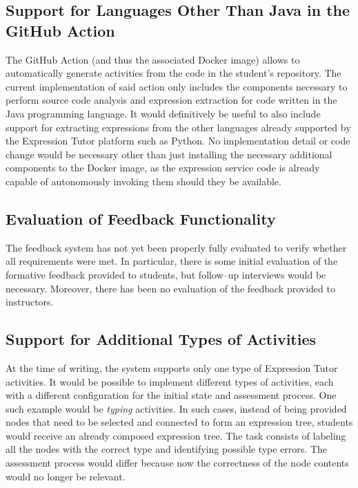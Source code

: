 \begin{chapterBody}
\subsection*{Support for Languages Other Than Java in the GitHub Action}

The GitHub Action (and thus the associated Docker image) allows to 
automatically generate activities from the code in the student's repository.
The current implementation of said action only includes the components necessary
to perform source code analysis and expression extraction for code written in
the Java programming language. It would definitively be useful to also include
support for extracting expressions from the other languages already supported by
the Expression Tutor platform such as Python. No implementation detail or code
change would be necessary other than just installing the necessary additional 
components to the Docker image, as the expression service code is already
capable of autonomously invoking them should they be available.

\subsection*{Evaluation of Feedback Functionality}

The feedback system has not yet been properly fully evaluated to verify whether
all requirements were met. In particular, there is some initial evaluation of
the formative feedback provided to students, but follow–up interviews would be
necessary. Moreover, there has been no evaluation of the feedback
provided to instructors.

\subsection*{Support for Additional Types of Activities}

At the time of writing, the system supports only one type of Expression
Tutor activities. It would be possible to implement different types of
activities, each with a different configuration for the initial state and
assessment process. One such example would be \textit{typing} activities.
In such cases, instead of being provided nodes that need to be selected and 
connected to form an expression tree, students would receive an already
composed expression tree. The task consists of labeling all the nodes with the
correct type and identifying possible type errors. The assessment process would
differ because now the correctness of the node contents would no longer be
relevant.

\end{chapterBody}

